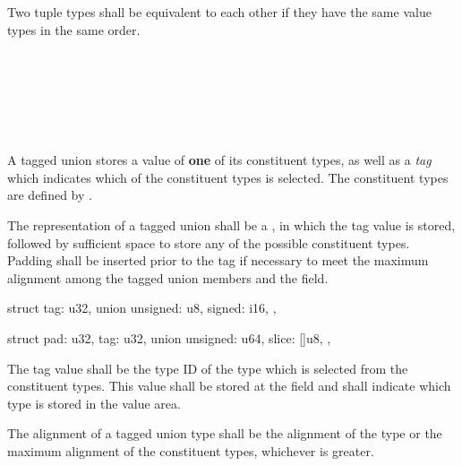 \specsubsubitem
Two tuple types shall be equivalent to each other if they have the same value
types in the same order.


\begin{grammar}
 \\
	\terminal{(}  \terminal{)} \\

 \\
	 \terminal{|}  \optional{\terminal{|}}\\
	 \terminal{|}  \\
\end{grammar}

\specsubsubitem
A tagged union stores a value of \textbf{one} of its constituent types, as well
as a \textit{tag} which indicates which of the constituent types is selected.
The constituent types are defined by .

\specsubsubitem
The representation of a tagged union shall be a , in which the
tag value is stored, followed by sufficient space to store any of the possible
constituent types. Padding shall be inserted prior to the tag if necessary to
meet the maximum alignment among the tagged union members and the 
field.


\begin{codesample}
struct {
	tag: u32,
	union {
		unsigned: u8,
		signed: i16,
	},
}
\end{codesample}
\begin{codesample}
struct {
	pad: u32,
	tag: u32,
	union {
		unsigned: u64,
		slice: []u8,
	},
}
\end{codesample}

\specsubsubitem
The tag value shall be the type ID of the type which is selected from the
constituent types. This value shall be stored at the  field and
shall indicate which type is stored in the value area.

\specsubsubitem
The alignment of a tagged union type shall be the alignment of the
 type or the maximum alignment of the constituent types,
whichever is greater.

